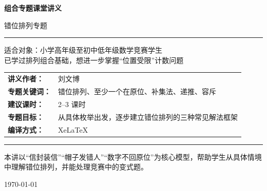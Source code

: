 \documentclass[11pt,a4paper,fontset=fandol]{ctexart}
\theoremstyle{formaltheorem}
\theoremstyle{formalexample}
\begin{document}
\thispagestyle{empty}
\begin{titlepage}
\centering
\vspace*{0.9cm}

\begin{tcolorbox}[
  enhanced,
  width=0.92\textwidth,
  colback=white,
  colframe=mainblue,
  boxrule=1pt,
  arc=0mm,
  left=6mm,
  right=6mm,
  top=8mm,
  bottom=8mm
]
\centering

{\fontsize{24}{30}\selectfont\bfseries 组合专题课堂讲义\par}
\vspace{0.7cm}
{\fontsize{17}{22}\selectfont 错位排列专题\par}

\vspace{1.1cm}
\color{rulegray}\rule{0.72\textwidth}{0.7pt}\par
\vspace{1cm}

\begin{tcolorbox}[colback=lightblue,colframe=mainblue,width=0.82\textwidth,boxrule=1pt]
\centering
{\Large 适合对象：小学高年级至初中低年级数学竞赛学生}\\[0.4em]
{\large 已学过排列组合基础，想进一步掌握“位置受限”计数问题}
\end{tcolorbox}

\vspace{1.2cm}

\renewcommand{\arraystretch}{1.42}
\begin{tabular}{>{\bfseries}p{3.5cm}p{8cm}}
讲义作者： & 刘文博 \\
专题关键词： & 错位排列、至少一个在原位、补集法、递推、容斥 \\
建议课时： & 2--3 课时 \\
专题目标： & 从具体枚举出发，逐步建立错位排列的三种常见解法框架 \\
编译方式： & XeLaTeX \\
\end{tabular}

\vspace{1.2cm}
\color{rulegray}\rule{0.72\textwidth}{0.7pt}\par
\vspace{0.8cm}

{\normalsize 本讲以“信封装信”“帽子发错人”“数字不回原位”为核心模型，帮助学生从具体情境中理解错位排列，并能处理竞赛中的变式题。\par}

\vspace{0.5cm}
{\large \today\par}
\end{tcolorbox}
\end{titlepage}
\end{document}
